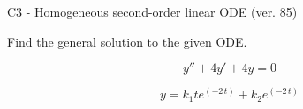\begin{exercise}
  \begin{exerciseTitle}C3 - Homogeneous second-order linear ODE (ver. 85)\end{exerciseTitle}
  \begin{exerciseStatement}
    
Find the general solution to the given ODE.

    
\[y''+4y'+4y = 0\]

  \end{exerciseStatement}
  \begin{exerciseAnswer}
    
\[y= k_{1} t e^{\left(-2 \, t\right)} + k_{2} e^{\left(-2 \, t\right)}\]

  \end{exerciseAnswer}
\end{exercise}